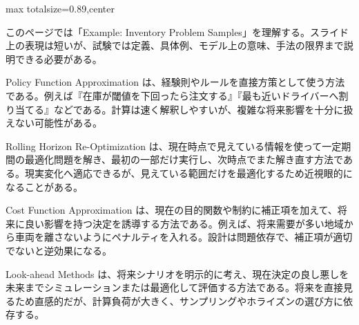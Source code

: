 \begin{minipage}[t]{0.58\textwidth}
\begin{adjustbox}{max totalsize={\textwidth}{0.89\textheight},center}
\begin{minipage}{\textwidth}\scriptsize
{}このページでは「Example: Inventory Problem Samples」を理解する。スライド上の表現は短いが、試験では定義、具体例、モデル上の意味、手法の限界まで説明できる必要がある。\par
Policy Function Approximation は、経験則やルールを直接方策として使う方法である。例えば『在庫が閾値を下回ったら注文する』『最も近いドライバーへ割り当てる』などである。計算は速く解釈しやすいが、複雑な将来影響を十分に扱えない可能性がある。\par
Rolling Horizon Re-Optimization は、現在時点で見えている情報を使って一定期間の最適化問題を解き、最初の一部だけ実行し、次時点でまた解き直す方法である。現実変化へ適応できるが、見えている範囲だけを最適化するため近視眼的になることがある。\par
Cost Function Approximation は、現在の目的関数や制約に補正項を加えて、将来に良い影響を持つ決定を誘導する方法である。例えば、将来需要が多い地域から車両を離さないようにペナルティを入れる。設計は問題依存で、補正項が適切でないと逆効果になる。\par
Look-ahead Methods は、将来シナリオを明示的に考え、現在決定の良し悪しを未来までシミュレーションまたは最適化して評価する方法である。将来を直接見るため直感的だが、計算負荷が大きく、サンプリングやホライズンの選び方に依存する。\par

\end{minipage}
\end{adjustbox}
\end{minipage}
